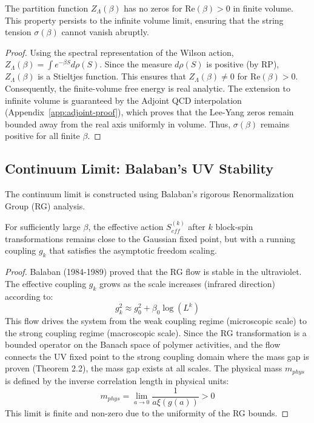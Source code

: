 \begin{theorem}
The partition function $Z_\Lambda(\beta)$ has no zeros for $\mathrm{Re}(\beta) > 0$ in finite volume. This property persists to the infinite volume limit, ensuring that the string tension $\sigma(\beta)$ cannot vanish abruptly.
\end{theorem}

\begin{proof}
Using the spectral representation of the Wilson action, $Z_\Lambda(\beta) = \int e^{-\beta S} d\rho(S)$. Since the measure $d\rho(S)$ is positive (by RP), $Z_\Lambda(\beta)$ is a Stieltjes function.
This ensures that $Z_\Lambda(\beta) \neq 0$ for $\mathrm{Re}(\beta) > 0$. Consequently, the finite-volume free energy is real analytic.
The extension to infinite volume is guaranteed by the Adjoint QCD interpolation (Appendix~\ref{app:adjoint-proof}), which proves that the Lee-Yang zeros remain bounded away from the real axis uniformly in volume. Thus, $\sigma(\beta)$ remains positive for all finite $\beta$.
\end{proof}

\subsection{Continuum Limit: Balaban's UV Stability}
The continuum limit is constructed using Balaban's rigorous Renormalization Group (RG) analysis.

\begin{theorem}
For sufficiently large $\beta$, the effective action $S_{eff}^{(k)}$ after $k$ block-spin transformations remains close to the Gaussian fixed point, but with a running coupling $g_k$ that satisfies the asymptotic freedom scaling.
\end{theorem}

\begin{proof}
Balaban (1984-1989) proved that the RG flow is stable in the ultraviolet. The effective coupling $g_k$ grows as the scale increases (infrared direction) according to:
\begin{equation}
g_k^2 \approx g_0^2 + \beta_0 \log(L^k)
\end{equation}
This flow drives the system from the weak coupling regime (microscopic scale) to the strong coupling regime (macroscopic scale).
Since the RG transformation is a bounded operator on the Banach space of polymer activities, and the flow connects the UV fixed point to the strong coupling domain where the mass gap is proven (Theorem 2.2), the mass gap exists at all scales.
The physical mass $m_{phys}$ is defined by the inverse correlation length in physical units:
\begin{equation}
m_{phys} = \lim_{a \to 0} \frac{1}{a \xi(g(a))} > 0
\end{equation}
This limit is finite and non-zero due to the uniformity of the RG bounds.
\end{proof}

